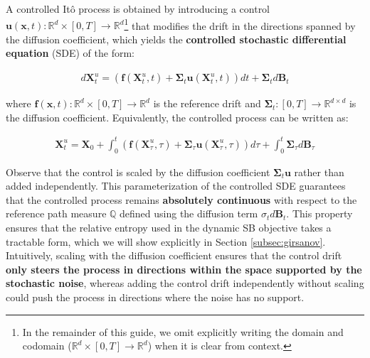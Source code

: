 \documentclass{article}
\begin{document}
\begin{definition}\label{def:controlled-ito}
    A controlled Itô process is obtained by introducing a control $\boldsymbol{u}(\boldsymbol{x},t):\mathbb{R}^d\times [0,T]\to \mathbb{R}^d$\footnote{In the remainder of this guide, we omit explicitly writing the domain and codomain ($\mathbb{R}^d \times [0,T] \to \mathbb{R}^d$) when it is clear from context.} that modifies the drift in the directions spanned by the diffusion coefficient, which yields the \textbf{controlled stochastic differential equation} (SDE) of the form: 
    \begin{small}
    \begin{align}
        d\boldsymbol{X}^u_t=\left(\boldsymbol{f}(\boldsymbol{X}_t^u,t)+\boldsymbol{\Sigma}_t\boldsymbol{u}(\boldsymbol{X}_t^u,t)\right)dt+\boldsymbol{\Sigma}_td\boldsymbol{B}_t\tag{Controlled SDE}\label{eq:controlled-sde}
    \end{align}
    \end{small}
    where $\boldsymbol{f}(\boldsymbol{x},t):\mathbb{R}^d \times[0,T] \to \mathbb{R}^d$ is the reference drift and $\boldsymbol{\Sigma}_t:[0,T] \to \mathbb{R}^{d\times d}$ is the diffusion coefficient. Equivalently, the controlled process can be written as:
    \begin{small}
    \begin{align}
        \boldsymbol{X}^u_t=\boldsymbol{X}_0+\int_0^t\left(\boldsymbol{f}(\boldsymbol{X}_\tau^u,\tau)+\boldsymbol{\Sigma}_\tau\boldsymbol{u}(\boldsymbol{X}_\tau^u,\tau)\right)d\tau+\int_0^t\boldsymbol{\Sigma}_\tau d\boldsymbol{B}_\tau
    \end{align}
    \end{small}
\end{definition}

Observe that the control is scaled by the diffusion coefficient $\boldsymbol{\Sigma}_t\boldsymbol{u}$ rather than added independently. This parameterization of the controlled SDE guarantees that the controlled process remains \textbf{absolutely continuous} with respect to the reference path measure $\mathbb{Q}$ defined using the diffusion term $\sigma_td\boldsymbol{B}_t$. This property ensures that the relative entropy used in the dynamic SB objective takes a tractable form, which we will show explicitly in Section \ref{subsec:girsanov}. Intuitively, scaling with the diffusion coefficient ensures that the control drift \textbf{only steers the process in directions within the space supported by the stochastic noise}, whereas adding the control drift independently without scaling could push the process in directions where the noise has no support.
\end{document}
